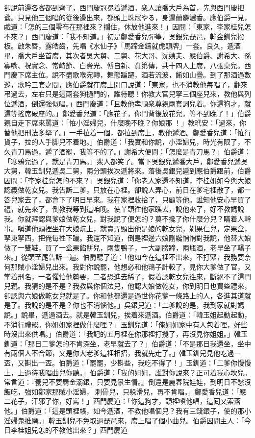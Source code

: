 卻說前邊各客都到齊了，西門慶冠冕着遞酒。衆人讓喬大戶為首，先與西門慶把盞。只見他三個唱的從後邊出來，都頭上珠冠やる，身邊蘭麝濃香。應伯爵一見，戲道：「怎的三個零布在那裡來？攔住，休放他進來！」因問：「東家，李家桂兒怎不來？」西門慶道：「我不知道。」初是鄭愛香兒彈箏，吳銀兒琵琶，韓金釧兒撥板。啟朱唇，露皓齒，先唱《水仙子》「馬蹄金鑄就虎頭牌」一套。{}良久，遞酒畢，喬大戶坐首席，其次者吳大舅、二舅、花大哥、沈姨夫、應伯爵、謝希大、孫寡嘴、祝實念、常峙節、白賚光、傅自新、賁第傳，共十四人上席，八張桌兒。西門慶下席主位。說不盡歌喉宛轉，舞態蹁躚，酒若流波，餚如山疊。到了那酒過數巡，歌吟三套之間，應伯爵就在席上開口說道：「東家，也不消教他每唱了，翻來弔過去，左右只是這兩套狗撾門的，誰待聽！你教大官兒拏三個座兒來，教他與列位遞酒，倒還強似唱。」西門慶道：「且教他孝順衆尊親兩套詞兒着。你這狗才，就這等搖席破座的。」鄭愛香兒道：「應花子，你門背後放花兒，等不到晚了！」伯爵親自走下席來罵道：「恠小淫婦兒，什麼晚不晚？你娘那𣭈！」教玳安：「過來，你替他把刑法多拏了。」一手拉着一個，都拉到席上，教他遞酒。鄭愛香兒道：「恠行貨子，拉的人手脚兒不着地。」伯爵道：「我實和你說，小淫婦兒，時光有限了，不久青刀馬過，遞了酒罷，我等不的了。」謝希大便問：「怎麼是青刀馬？」伯爵道：「寒鴉兒過了，就是青刀馬。」衆人都笑了。當下吳銀兒遞喬大戶，鄭愛香兒遞吳大舅，韓玉釧兒遞吳二舅，兩分頭挨次遞將來。落後吳銀兒遞到應伯爵跟前，伯爵因問：「李家桂兒怎的不來？」吳銀兒道：「你老人家還不知道，李桂姐如今與大娘認義做乾女兒。我告訴二爹，只放在心裡。卻說人弄心，前日在爹宅裡散了，都一答兒家去了，都會下了明日早來。我在家裡收拾了，只顧等他。誰知他安心早買了禮，就先來了，倒教我等到這咱晚。使丫頭徃他家瞧去，說他來了，好不教媽說我。你就拜認與爹娘做乾女兒，對我說了便怎的？莫不攙了你什麼分兒？瞞着人幹事。嗔道他頭裡坐在大娘炕上，就賣弄顯出他是娘的乾女兒，剝果仁兒，定果盒，拏東拏西，把俺每徃下躧。我還不知道，倒是裡邊六娘剛纔悄悄對我說，他替大娘做了一雙鞋，買了一盒果餡餅兒，兩隻鴨子，一大副膀蹄，兩瓶酒，老早坐了轎子來。」從頭至尾告訴一遍。伯爵聽了道：「他如今在這裡不出來，不打緊，我務要奈何那賊小淫婦兒出來。我對你說罷，他想必和他鴇子計較了，見你大爹做了官，又掌着刑名，一者懼怕他勢要，二者恐進去稀了，假着認乾女兒徃來，斷絕不了這門兒親。我猜的是不是？我教與你個法兒，他認大娘做乾女，你到明日也買些禮來，卻認與六娘做乾女兒就是了。你和他都還是過世你花爹一條路上的人，各進其道就是了。我說的是不是？你也不消惱他。」吳銀兒道：「二爹說的是，我到家就對媽說。」說畢，遞過酒去。就是韓玉釧兒，挨着來遞酒。伯爵道：「韓玉姐起動起動，不消行禮罷。你姐姐家裡做什麼哩？」玉釧兒道：「俺姐姐家中有人包着哩，好些時沒出來供唱。」伯爵道：「我記的五月裡在你那裡打攪了，再沒見你姐姐。」韓玉釧道：「那日二爹怎的不肯深坐，老早就去了？」伯爵道：「不是那日我還坐，坐中有兩個人不合節，又是你大老爹這裡相招，我就先走了。」韓玉釧兒見他吃過一盃，又斟出一盃。伯爵道：「罷罷，少斟些，我吃不得了！」玉釧道：「二爹你慢慢上，上過待我唱曲兒你聽。」伯爵道：「我的姐姐，誰對你說來？正可着我心坎兒。常言道：『養兒不要屙金溺銀，只要見景生情。』倒還是麗春院娃娃，到明日不愁沒飯吃，強如鄭家那賊小淫婦，𢱉剌骨兒，只躲滑兒，再不肯唱。」鄭愛香兒道：「應二花子，汗邪了你，好罵！」西門慶道：「你這狗才，頭裡嗔他唱，這囘又索落他。」伯爵道：「這是頭裡帳，如今遞酒，不教他唱個兒？我有三錢銀子，使的那小淫婦鬼推磨。」韓玉釧兒不免取過琵琶來，席上唱了個小曲兒。伯爵因問主人：「今日李桂姐兒怎的不教他出來？」西門慶道